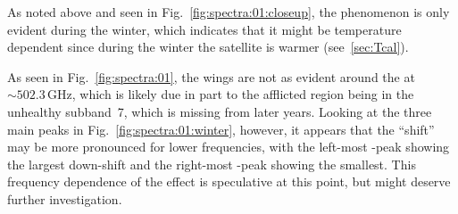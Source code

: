 As noted above and seen in Fig.~\ref{fig:spectra:01:closeup}, the phenomenon is
only evident during the winter, which indicates that it might be temperature
dependent since during the winter the satellite is warmer (see~\ref{sec:Tcal}).

As seen in Fig.~\ref{fig:spectra:01}, the wings are not as evident around the
 at $\sim502.3\,\mathrm{GHz}$, which is likely due in part to the
afflicted region being in the unhealthy subband~7, which is missing from later
years.  Looking at the three main peaks in Fig.~\ref{fig:spectra:01:winter},
however, it appears that the ``shift'' may be more pronounced for lower
frequencies, with the left-most -peak showing the largest down-shift
and the right-most -peak showing the smallest.  This frequency
dependence of the effect is speculative at this point, but might deserve
further investigation.  
